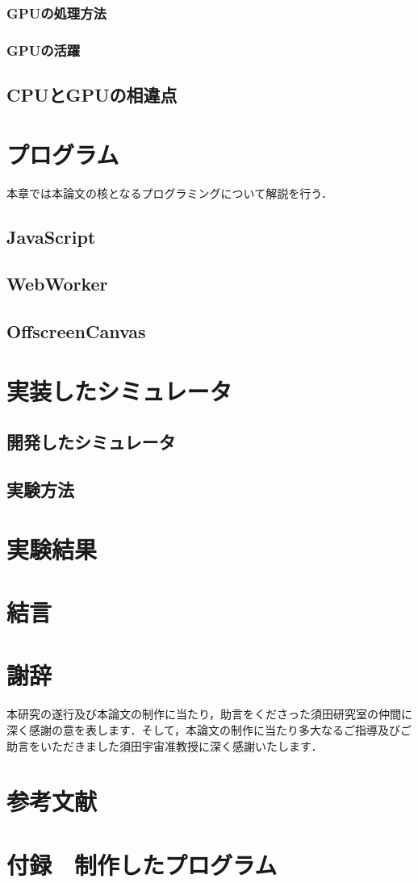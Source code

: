 \documentclass[a4j,12pt]{jsarticle}
\begin{document}
\subsubsection{GPUの処理方法}
\subsubsection{GPUの活躍}

\subsection{CPUとGPUの相違点}
\newpage

\section{プログラム}
本章では本論文の核となるプログラミングについて解説を行う．
\subsection{JavaScript}
\subsection{WebWorker}
\subsection{OffscreenCanvas}
\newpage

\section{実装したシミュレータ}
\subsection{開発したシミュレータ}
\subsection{実験方法}
\newpage

\section{実験結果}
\newpage

\section{結言}
\newpage

\section{謝辞}
本研究の遂行及び本論文の制作に当たり，助言をくださった須田研究室の仲間に深く感謝の意を表します．そして，本論文の制作に当たり多大なるご指導及びご助言をいただきました須田宇宙准教授に深く感謝いたします．
\newpage

\section{参考文献}
\newpage

\section{付録　制作したプログラム}
\end{document}
